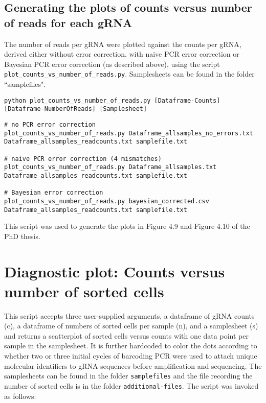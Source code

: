 \subsection{Generating the plots of counts versus number of reads for each gRNA}

The number of reads per gRNA were plotted against the counts per gRNA, derived either without error correction, with naive PCR error correction or Bayesian PCR error correction (as described above), using the script \verb|plot_counts_vs_number_of_reads.py|. Samplesheets can be found in the folder ``samplefiles".

\begin{small}\begin{lstlisting}
python plot_counts_vs_number_of_reads.py [Dataframe-Counts] [Dataframe-NumberOfReads] [Samplesheet]
\end{lstlisting}\end{small}

\begin{small}\begin{lstlisting}
# no PCR error correction
plot_counts_vs_number_of_reads.py Dataframe_allsamples_no_errors.txt Dataframe_allsamples_readcounts.txt samplefile.txt

# naive PCR error correction (4 mismatches)
plot_counts_vs_number_of_reads.py Dataframe_allsamples.txt Dataframe_allsamples_readcounts.txt samplefile.txt

# Bayesian error correction
plot_counts_vs_number_of_reads.py bayesian_corrected.csv Dataframe_allsamples_readcounts.txt samplefile.txt
\end{lstlisting}\end{small}

This script was used to generate the plots in Figure 4.9 and Figure 4.10 of the PhD thesis. 

\section{Diagnostic plot: Counts versus number of sorted cells}

This script accepts three user-supplied arguments, a dataframe of gRNA counts (c), a dataframe of numbers of sorted cells per sample (n), and a samplesheet (s) and returns a scatterplot of sorted cells versus counts with one data point per sample in the samplesheet. It is further hardcoded to color the dots according to whether two or three initial cycles of barcoding PCR were used to attach unique molecular identifiers to gRNA sequences before amplification and sequencing. The samplesheets can be found in the folder \verb|samplefiles| and the file recording the number of sorted cells is in the folder \verb|additional-files|. The script was invoked as follows:

